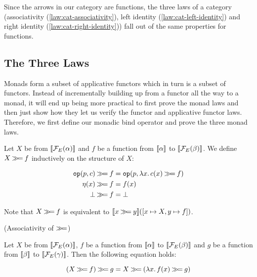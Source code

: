 Since the arrows in our category are functions, the three laws of a
category (associativity (\ref{law:cat-associativity}), left identity
(\ref{law:cat-left-identity}) and right identity
(\ref{law:cat-right-identity})) fall out of the same properties for
functions.


\subsection{The Three Laws}
\label{ssec:three-laws}

Monads form a subset of applicative functors which in turn is a subset of
functors. Instead of incrementally building up from a functor all the way
to a monad, it will end up being more practical to first prove the monad
laws and then just show how they let us verify the functor and applicative
functor laws. Therefore, we first define our monadic bind operator and
prove the three monad laws.

\begin{definition}
  Let $X$ be from $\llbracket \mathcal{F}_E(\alpha) \rrbracket$ and $f$ be a function from
  $\llbracket \alpha \rrbracket$ to $\llbracket \mathcal{F}_E(\beta) \rrbracket$. We define $X \mathbin{\gg\!=} f$
  inductively on the structure of $X$:

  \begin{align*}
    \mathtt{op}(p, c) \mathbin{\gg\!=} f &= \mathtt{op}(p, \lambda x.\, c(x) \mathbin{\gg\!=} f) \\
    \eta(x) \mathbin{\gg\!=} f &= f(x) \\
    \bot \mathbin{\gg\!=} f &= \bot
  \end{align*}

  Note that $X \mathbin{\gg\!=} f$ is equivalent to
  $\llbracket x \mathbin{\gg\!=} y \rrbracket([x \mapsto X, y \mapsto f])$.
\end{definition}

\begin{law}\label{law:associativity}
  (Associativity of $\mathbin{\gg\!=}$)
  
  Let $X$ be from $\llbracket \mathcal{F}_E(\alpha) \rrbracket$, $f$ be a function from
  $\llbracket \alpha \rrbracket$ to $\llbracket \mathcal{F}_E(\beta) \rrbracket$ and $g$ be a function from
  $\llbracket \beta \rrbracket$ to $\llbracket \mathcal{F}_E(\gamma) \rrbracket$. Then the following equation
  holds:
  
  $$
  (X \mathbin{\gg\!=} f) \mathbin{\gg\!=} g = X \mathbin{\gg\!=} (\lambda x.\, f(x) \mathbin{\gg\!=} g)
  $$
\end{law}

